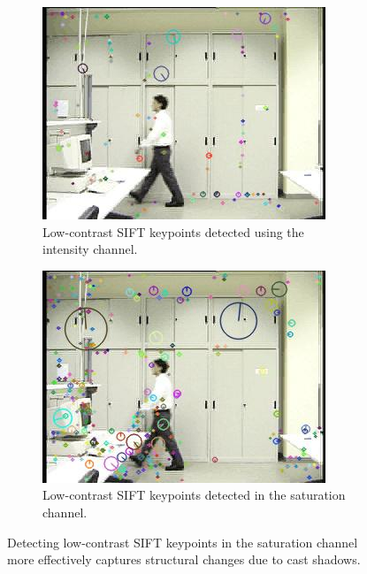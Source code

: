\documentclass[12pt]{report}
\begin{document}
\begin{figure}
  \centering
  \begin{subfigure}{.75\linewidth}
 \includegraphics[width=1\linewidth]{figures/lab_lowc_rgb_0161.jpg}
  \caption{Low-contrast SIFT keypoints detected using the intensity channel.}
\end{subfigure}
\hfill
\begin{subfigure}{.75\linewidth}
 \includegraphics[width=1\linewidth]{figures/lab_lowc_sat_0161.jpg}
  \caption{Low-contrast SIFT keypoints detected in the saturation channel.}
\end{subfigure}

\caption{Detecting low-contrast SIFT keypoints in the saturation channel more effectively captures structural changes due to cast shadows.}
\label{fig:sat_lowc_kp}
\end{figure}
\end{document}

